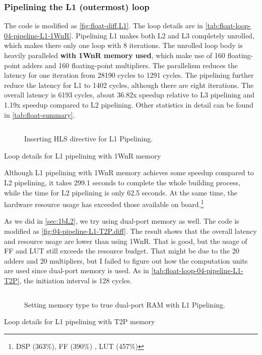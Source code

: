 \subsubsection{Pipelining the L1 (outermost) loop}\label{sec:1bL1}

The code is modified as \autoref{fig:float-diff.L1}.
The loop details are in \autoref{tab:float-loop-04-pipeline-L1-1WnR}.
Pipelining L1 makes both L2 and L3 completely unrolled, which makes there only one loop with 8 iterations.
The unrolled loop body is heavily paralleled \textbf{with 1WnR memory used}, which make use of 160 floating-point adders and 160 floating-point multipliers.
The parallelism reduces the latency for one iteration from 28190 cycles to 1291 cycles.
The pipelining further reduce the latency for L1 to 1402 cycles, although there are eight iterations.
The overall latency is 6193 cycles, about 36.82x speedup relative to L3 pipelining and 1.19x speedup compared to L2 pipelining.
Other statistics in detail can be found in \autoref{tab:float-summary}.

\begin{figure}[ht!]
    \centering
    \inputminted{diff}{program/diff.L1}
    \caption{Inserting HLS directive for L1 Pipelining.}\label{fig:float-diff.L1}
\end{figure}

\begin{table}[ht!]
    \caption{Loop details for L1 pipelining with 1WnR memory}
    \label{tab:float-loop-04-pipeline-L1-1WnR}
    \centering
    
\end{table}

Although L1 pipelining with 1WnR memory achieves some speedup compared to L2 pipelining, it takes 299.1 seconds to complete the whole building process, while the time for L2 pipelining is only 62.5 seconds.
At the same time, the hardware resource usage has exceeded those available on board.\footnote{
    DSP (363\%), FF (390\%) , LUT (457\%)
}

As we did in \autoref{sec:1bL2}, we try using dual-port memory as well.
The code is modified as \autoref{fig:04-pipeline-L1-T2P.diff}.
The result shows that the overall latency and resource usage are lower than using 1WnR.
That is good, but the usage of FF and LUT still exceeds the resource budget.
That might be due to the 20 adders and 20 multipliers, but I failed to figure out how the computation units are used since dual-port memory is used.
As in \autoref{tab:float-loop-04-pipeline-L1-T2P}, the initiation interval is 128 cycles.

\begin{figure}[ht!]
    \centering
    \inputminted[firstline=3]{diff}{program/04-pipeline-L1-T2P.diff}
    \caption{Setting memory type to true dual-port RAM with L1 Pipelining.}\label{fig:04-pipeline-L1-T2P.diff}
\end{figure}

\begin{table}[ht!]
    \caption{Loop details for L1 pipelining with T2P memory}
    \label{tab:float-loop-04-pipeline-L1-T2P}
    \centering
    
\end{table}